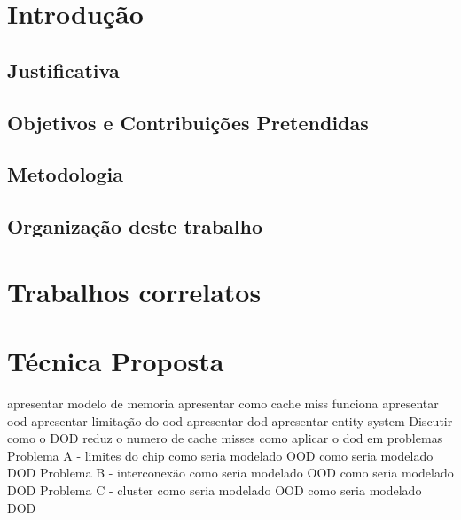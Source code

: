 \chapter{Introdução}
\label{cap:introducao}


\section{Justificativa}



\section{Objetivos e Contribuições Pretendidas}

\section{Metodologia}




\section{Organização deste trabalho}


\chapter{Trabalhos correlatos}


\chapter{Técnica Proposta}



apresentar modelo de memoria
apresentar como cache miss funciona
apresentar ood
apresentar limitação do ood
apresentar dod
apresentar entity system
Discutir como o DOD reduz o numero de cache misses
como aplicar o dod em problemas
    Problema A - limites do chip
        como seria modelado OOD
        como seria modelado DOD
    Problema B - interconexão
        como seria modelado OOD
        como seria modelado DOD
    Problema C - cluster
        como seria modelado OOD
        como seria modelado DOD